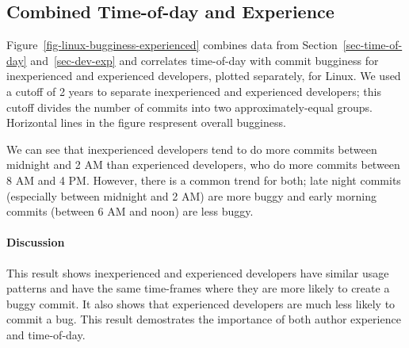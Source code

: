 \subsection{Combined Time-of-day and Experience}
\label{sec:toddev-exp}

Figure~\ref{fig-linux-bugginess-experienced} combines data from
Section~\ref{sec-time-of-day} and~\ref{sec-dev-exp} and correlates time-of-day
with commit bugginess for inexperienced and experienced developers,
plotted separately, for Linux. We used
a cutoff of 2 years to separate inexperienced and experienced developers; 
this cutoff divides the number of commits into two approximately-equal groups. 
Horizontal lines in the figure respresent overall
bugginess. 

We can see that inexperienced developers tend to do more commits between
midnight and 2 AM than experienced developers, who do more commits between 8 AM
and 4 PM. However, there is a common trend for both; late night commits
(especially between midnight and 2 AM) are more buggy and early morning commits
(between 6 AM and noon) are less buggy.

\paragraph{Discussion}

This result shows inexperienced and experienced developers have similar usage
patterns and have the same time-frames where they are more likely to create a
buggy commit. It also shows that experienced developers are much less likely to
commit a bug.  This result demostrates the importance of both author experience
and time-of-day.


